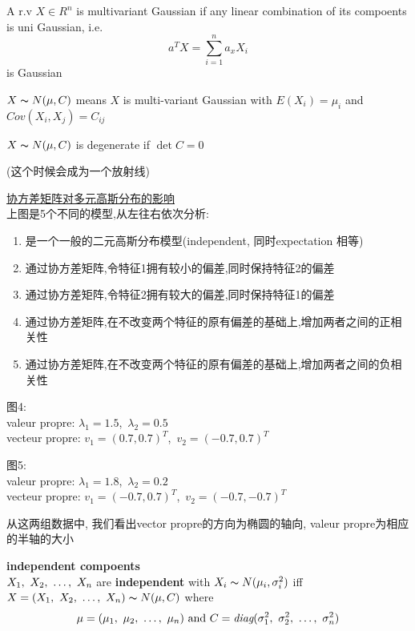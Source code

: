 \documentclass{article}
\begin{document}
\begin{definition}
A r.v $X \in R^n$ is multivariant Gaussian if any linear combination of its compoents is uni Gaussian, i.e.
$$a^T X = \sum_{i=1}^n a_x X_i$$ is Gaussian
\end{definition}

$X \thicksim{N}(\mu, C)$ means $X$ is multi-variant Gaussian with $E(X_i) = \mu_i$ and $Cov(X_i, X_j) = C_{ij}$

\begin{definition}
$X \thicksim{N}(\mu, C)$ is degenerate if $\det{C} = 0$
\end{definition}
(这个时候会成为一个放射线)

\href{http://www.ryanzhang.info/wp-content/uploads/2013/07/QQ\%E6\%88\%AA\%E5\%9B\%BE20130706200349.png}{协方差矩阵对多元高斯分布的影响}\\
上图是5个不同的模型,从左往右依次分析:
\begin{enumerate}
\item 是一个一般的二元高斯分布模型(independent, 同时expectation 相等)
\item 通过协方差矩阵,令特征1拥有较小的偏差,同时保持特征2的偏差
\item 通过协方差矩阵,令特征2拥有较大的偏差,同时保持特征1的偏差
\item 通过协方差矩阵,在不改变两个特征的原有偏差的基础上,增加两者之间的正相关性
\item 通过协方差矩阵,在不改变两个特征的原有偏差的基础上,增加两者之间的负相关性
\end{enumerate}

图4:\\
valeur propre:
$\lambda_1 = 1.5$,\
$\lambda_2 = 0.5$\\
vecteur propre:
$v_1 = (0.7, 0.7)^T$,\
$v_2 = (-0.7, 0.7)^T$

图5:\\
valeur propre:
$\lambda_1 = 1.8$,\
$\lambda_2 = 0.2$\\
vecteur propre:
$v_1 = (-0.7, 0.7)^T$,\
$v_2 = (-0.7, -0.7)^T$

从这两组数据中, 我们看出vector propre的方向为椭圆的轴向, valeur propre为相应的半轴的大小

\begin{theorem}
\textbf{independent compoents}\\
$X_1,~X_2,~\ldots,~X_n$ are \textbf{independent} with $X_i \thicksim{N}(\mu_i, \sigma_i^2)$ iff $X = (X_1,~X_2,~\ldots,~X_n) \thicksim{N}(\mu, C)$ where
$$\mu = (\mu_1,~\mu_2,~\ldots,~\mu_n) \hbox{ and } C = \textit{diag}(\sigma^2_1,~\sigma^2_2,~\ldots,~\sigma^2_n)$$
\label{theorem.gauss.indepent_component}
\end{theorem}
\end{document}
